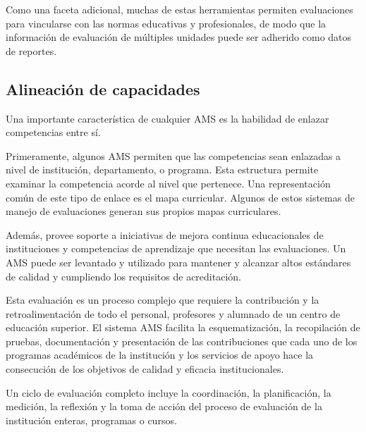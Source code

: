 Como una faceta adicional, muchas de estas herramientas permiten evaluaciones para vincularse con las normas educativas y profesionales, de modo que la información de evaluación de múltiples unidades puede ser adherido como datos de reportes.

\subsection{Alineación de capacidades}
Una importante característica de cualquier AMS es la habilidad de enlazar competencias entre sí.

Primeramente, algunos AMS permiten que las competencias sean enlazadas a nivel de institución, departamento, o programa. Esta estructura permite examinar la competencia acorde al nivel que pertenece. Una representación común de este tipo de enlace es el mapa curricular. Algunos de estos sistemas de manejo de evaluaciones generan sus propios mapas curriculares.

Además, provee soporte a iniciativas de mejora continua educacionales de instituciones y competencias de aprendizaje que necesitan las evaluaciones. Un AMS puede ser levantado y utilizado para mantener y alcanzar altos estándares de calidad y cumpliendo los requisitos de acreditación\citep{kuh_using_2015}.

Esta evaluación es un proceso complejo que requiere la contribución y la retroalimentación de todo el personal, profesores y alumnado de un centro de educación superior. El sistema AMS facilita la esquematización, la recopilación de pruebas, documentación y presentación de las contribuciones que cada uno de los programas académicos de la institución y los servicios de apoyo hace la consecución de los objetivos de calidad y eficacia institucionales.

Un ciclo de evaluación completo incluye la coordinación, la planificación, la medición, la reflexión y la toma de acción del proceso de evaluación de la institución enteras, programas o cursos.